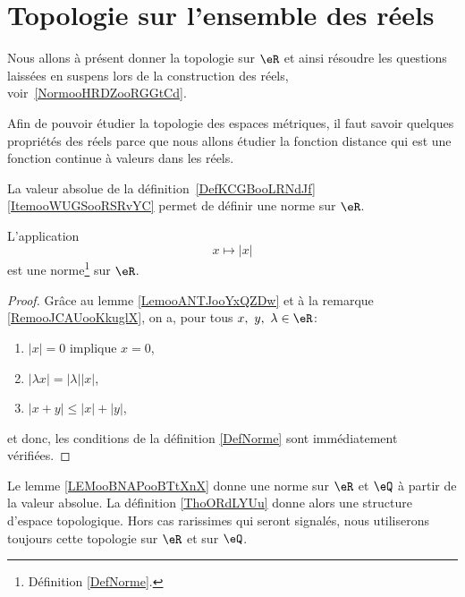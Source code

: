 
\section{Topologie sur l'ensemble des réels}
\label{SECooGKHYooMwHQaD}

Nous allons à présent donner la topologie sur \( \eR\) et ainsi résoudre les questions laissées en suspens lors de la construction des réels, voir~\ref{NormooHRDZooRGGtCd}.


Afin de pouvoir étudier la topologie des espaces métriques, il faut savoir quelques propriétés des réels parce que nous allons étudier la fonction distance qui est une fonction continue à valeurs dans les réels.

La valeur absolue de la définition~\ref{DefKCGBooLRNdJf}\ref{ItemooWUGSooRSRvYC} permet de définir une norme sur \( \eR\).
\begin{lemma}       \label{LEMooBNAPooBTtXnX}
    L'application
    \begin{equation}
         x\mapsto | x |
    \end{equation}
    est une norme\footnote{Définition \ref{DefNorme}.} sur $\eR$.
\end{lemma}

\begin{proof}
  Grâce au lemme \ref{LemooANTJooYxQZDw} et à la remarque \ref{RemooJCAUooKkuglX}, on a, pour tous \(x,\ y,\ \lambda \in \eR \):
\begin{enumerate}
\item $| x |=0$ implique $x=0$,
\item $| \lambda x |=| \lambda | |x |$,
\item $| x+y |\leq | x |+| y |$,
\end{enumerate}
et donc, les conditions de la définition \ref{DefNorme} sont immédiatement vérifiées.
\end{proof}

\begin{definition}      \label{DEFooNYGIooVGHSIA}
    Le lemme \ref{LEMooBNAPooBTtXnX} donne une norme sur \( \eR\) et \( \eQ\) à partir de la valeur absolue. La définition \ref{ThoORdLYUu} donne alors une structure d'espace topologique. Hors cas rarissimes qui seront signalés, nous utiliserons toujours cette topologie sur \( \eR\) et sur \( \eQ\).

\end{definition}


